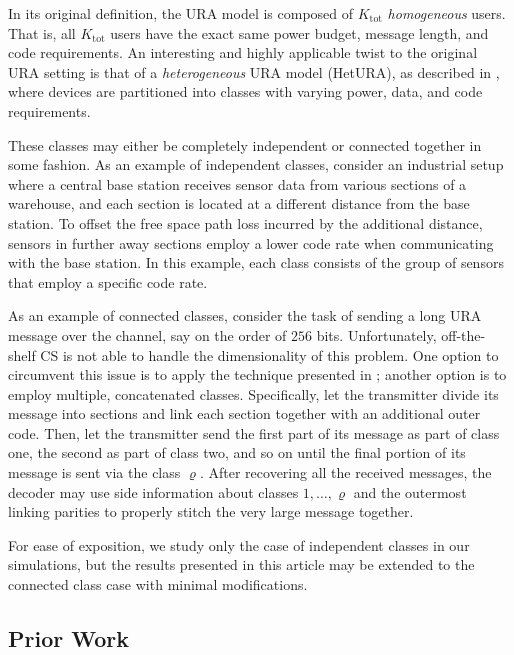 \documentclass[journal]{IEEEtran}
\begin{document}
In its original definition, the URA model is composed of $K_{\mathrm{tot}}$ \textit{homogeneous} users.
That is, all $K_{\mathrm{tot}}$ users have the exact same power budget, message length, and code requirements. 
An interesting and highly applicable twist to the original URA setting is that of a \textit{heterogeneous} URA model (HetURA), as described in \cite{hao2020exploration}, where devices are partitioned into classes with varying power, data, and code requirements.

These classes may either be completely independent or connected together in some fashion. 
As an example of independent classes, consider an industrial setup where a central base station receives sensor data from various sections of a warehouse, and each section is located at a different distance from the base station.
To offset the free space path loss incurred by the additional distance, sensors in further away sections employ a lower code rate when communicating with the base station. 
In this example, each class consists of the group of sensors that employ a specific code rate.

As an example of connected classes, consider the task of sending a long URA message over the channel, say on the order of $256$ bits.
Unfortunately, off-the-shelf CS is not able to handle the dimensionality of this problem.
One option to circumvent this issue is to apply the technique presented in \cite{ebert2020hybrid}; another option is to employ multiple, concatenated classes. 
Specifically, let the transmitter divide its message into sections and link each section together with an additional outer code. 
Then, let the transmitter send the first part of its message as part of class one, the second as part of class two, and so on until the final portion of its message is sent via the class $\varrho$.
After recovering all the received messages, the decoder may use side information about classes $1, \ldots, \varrho$ and the outermost linking parities to properly stitch the very large message together.

For ease of exposition, we study only the case of independent classes in our simulations, but the results presented in this article may be extended to the connected class case with minimal modifications.

\subsection{Prior Work}
\end{document}
